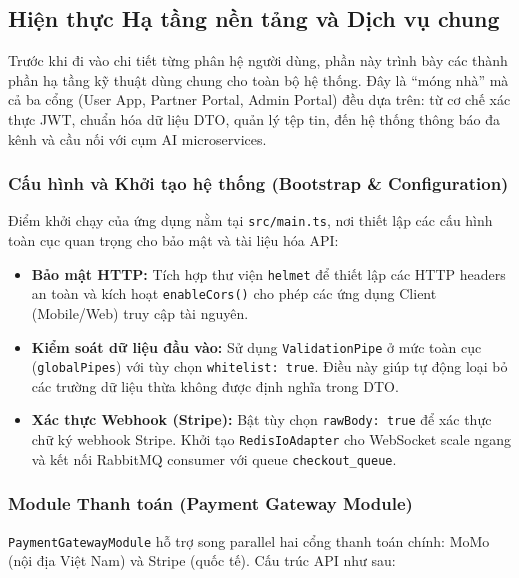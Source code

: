 \subsection{Hiện thực Hạ tầng nền tảng và Dịch vụ chung}

Trước khi đi vào chi tiết từng phân hệ người dùng, phần này trình bày các thành phần hạ tầng kỹ thuật dùng chung cho toàn bộ hệ thống. Đây là ``móng nhà'' mà cả ba cổng (User App, Partner Portal, Admin Portal) đều dựa trên: từ cơ chế xác thực JWT, chuẩn hóa dữ liệu DTO, quản lý tệp tin, đến hệ thống thông báo đa kênh và cầu nối với cụm AI microservices.

\subsubsection{Cấu hình và Khởi tạo hệ thống (Bootstrap \& Configuration)}

Điểm khởi chạy của ứng dụng nằm tại \texttt{src/main.ts}, nơi thiết lập các cấu hình toàn cục quan trọng cho bảo mật và tài liệu hóa API:

\begin{itemize}
    \item \textbf{Bảo mật HTTP:} Tích hợp thư viện \texttt{helmet} để thiết lập các HTTP headers an toàn và kích hoạt \texttt{enableCors()} cho phép các ứng dụng Client (Mobile/Web) truy cập tài nguyên.
    
    \item \textbf{Kiểm soát dữ liệu đầu vào:} Sử dụng \texttt{ValidationPipe} ở mức toàn cục (\texttt{globalPipes}) với tùy chọn \texttt{whitelist: true}. Điều này giúp tự động loại bỏ các trường dữ liệu thừa không được định nghĩa trong DTO.
    
    \item \textbf{Xác thực Webhook (Stripe):} Bật tùy chọn \texttt{rawBody: true} để xác thực chữ ký webhook Stripe. Khởi tạo \texttt{RedisIoAdapter} cho WebSocket scale ngang và kết nối RabbitMQ consumer với queue \texttt{checkout\_queue}.
\end{itemize}

\subsubsection{Module Thanh toán (Payment Gateway Module)}

\texttt{PaymentGatewayModule} hỗ trợ song parallel hai cổng thanh toán chính: MoMo (nội địa Việt Nam) và Stripe (quốc tế). Cấu trúc API như sau:


